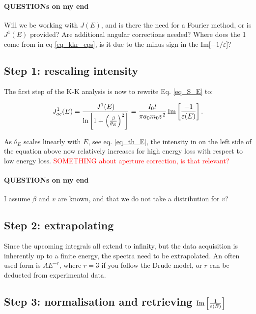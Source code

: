 \documentclass[12pt,a4paper]{article}
\def\frac#1#2{{{#1}\over {#2}}}
\numberwithin{equation}{section}
\numberwithin{figure}{section}
\numberwithin{table}{section}
\begin{document}
\paragraph{QUESTIONs on my end} Will we be working with $J(E)$, and is there the need for a Fourier method, or is $J^1(E)$ provided? Are additional angular corrections needed? Where does the 1 come from in eq \eqref{eq_kkr_eps}, is it due to the minus sign in the Im[$-1/\varepsilon$]?

\subsection{Step 1: rescaling intensity}
The first step of the K-K analysis is now to rewrite Eq. \eqref{eq_S_E} to:

\begin{equation}\label{eq_J_ac}
    J^1_{ac}(E) = \frac{J^1(E)}{\ln \left[1+\left(\frac{\beta}{\theta_{E}}\right)^{2}\right]} =\frac{I_{0} t}{\pi a_{0} m_{0} v^{2}}  \operatorname{Im}\left[\frac{-1}{\varepsilon(E)}\right] .
\end{equation}


As $\theta_E$ scales linearly with $E$, see eq. \eqref{eq_th_E}, the intensity in on the left side of the equation above now relatively increases for high energy loss with respect to low energy loss. \textcolor{red}{SOMETHING about aperture correction, is that relevant? }


\paragraph{QUESTIONs on my end} I assume $\beta$ and $v$ are known, and that we do not take a distribution for $v$? 


\subsection{Step 2: extrapolating}
Since the upcoming integrals all extend to infinity, but the data acquisition is inherently up to a finite energy, the spectra need to be extrapolated. An often used form is $AE^{-r}$, where $r=3$ if you follow the Drude-model, or $r$ can be deducted from experimental data.



\subsection{Step 3: normalisation and retrieving $\operatorname{Im}\left[\frac{1}{\varepsilon(E)}\right]$}
\end{document}
